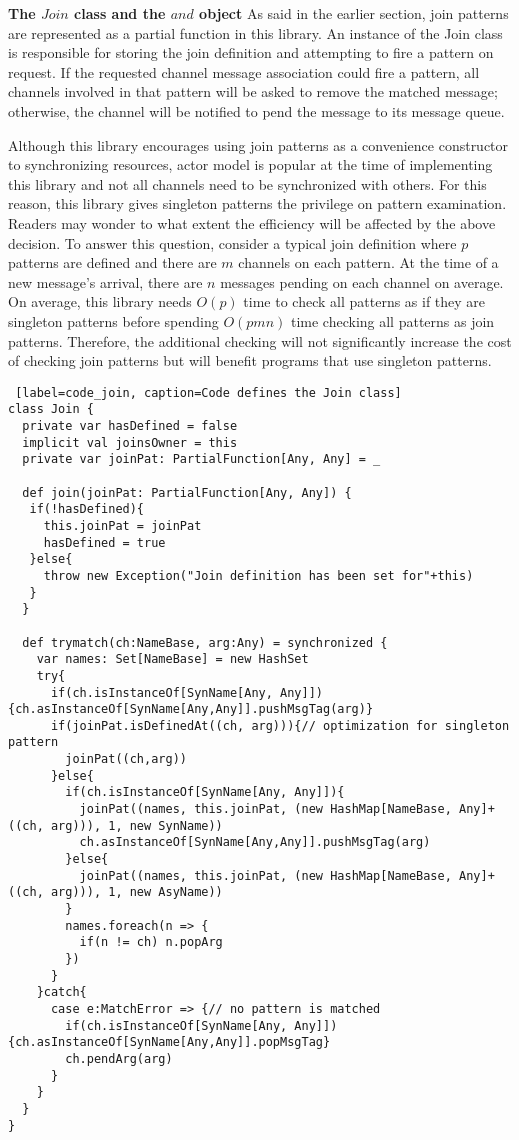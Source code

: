 {\bf{The $Join$ class and the $and$ object}}
\label{join_and}
As said in the earlier section, join patterns are represented as a partial function in this library.  An instance of the Join class is responsible for storing the join definition and attempting to fire a pattern on request.  If the requested channel message association could fire a pattern, all channels involved in that pattern will be asked to remove the matched message;  otherwise, the channel will be notified to pend the message to its message queue.

Although this library encourages using join patterns as a convenience constructor to synchronizing resources, actor model is popular at the time of implementing this library and not all channels need to be synchronized with others.  For this reason, this library gives singleton patterns the privilege on pattern examination.  Readers may wonder to what extent the efficiency will be affected by the above decision.  To answer this question, consider a typical join definition where $p$ patterns are defined and there are $m$ channels on each pattern.  At the time of a new message's arrival, there are $n$ messages pending on each channel on average.  On average, this library needs $O(p)$ time to check all patterns as if they are singleton patterns before spending $O(pmn)$ time checking all patterns as join patterns.  Therefore, the additional checking will not significantly increase the cost of checking join patterns but will benefit programs that use singleton patterns.

\begin{lstlisting} [label=code_join, caption=Code defines the Join class]
class Join {
  private var hasDefined = false
  implicit val joinsOwner = this
  private var joinPat: PartialFunction[Any, Any] = _

  def join(joinPat: PartialFunction[Any, Any]) { 
   if(!hasDefined){
     this.joinPat = joinPat
     hasDefined = true
   }else{
     throw new Exception("Join definition has been set for"+this)
   }
  }
   
  def trymatch(ch:NameBase, arg:Any) = synchronized {
    var names: Set[NameBase] = new HashSet
    try{
      if(ch.isInstanceOf[SynName[Any, Any]]) {ch.asInstanceOf[SynName[Any,Any]].pushMsgTag(arg)}
      if(joinPat.isDefinedAt((ch, arg))){// optimization for singleton pattern        
        joinPat((ch,arg))
      }else{
        if(ch.isInstanceOf[SynName[Any, Any]]){
          joinPat((names, this.joinPat, (new HashMap[NameBase, Any]+((ch, arg))), 1, new SynName))            
          ch.asInstanceOf[SynName[Any,Any]].pushMsgTag(arg)          
        }else{
          joinPat((names, this.joinPat, (new HashMap[NameBase, Any]+((ch, arg))), 1, new AsyName))
        }
        names.foreach(n => {
          if(n != ch) n.popArg
        })
      }
    }catch{
      case e:MatchError => {// no pattern is matched
        if(ch.isInstanceOf[SynName[Any, Any]]) {ch.asInstanceOf[SynName[Any,Any]].popMsgTag}
        ch.pendArg(arg)
      }
    }
  }
}
\end{lstlisting}


